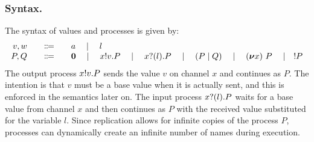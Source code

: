 \subsubsection{Syntax.}
The syntax of values and processes is given by:
\begin{displaymath}
  \begin{array}{r@{\qquad}c@{\qquad}l}
    v,w & \Coloneqq & a \quad\mid\quad l \\
    P,Q & \Coloneqq & \Pend
               \quad \mid\quad \Pout{x}{v}{P}
               \quad \mid\quad \Pin{x}{l}{P}
               \quad \mid\quad \PBpar{P}{Q}
               \quad \mid\quad \Pres{x}{}{P}
               \quad \mid\quad !P
  \end{array}
\end{displaymath}
The output process \( x ! v . P \) sends the value \( v \) on channel \( x \) and continues as \( P \).
The intention is that \( v \) must be a base value when it is actually sent, and this is enforced in the semantics later on.
The input process \( x ? (l) . P \) waits for a base value from channel \( x \) and then continues as \( P \) with the received value substituted for the variable \( l \).
Since replication allows for infinite copies of the process $P$, processes can dynamically
create an infinite number of names during execution.

